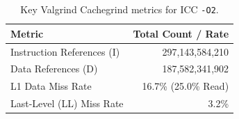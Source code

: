 \begin{table}[H]
\centering
\caption{Key Valgrind Cachegrind metrics for ICC \texttt{-O2}.}
\label{tab:cachegrind_results_o2}
\begin{tabular}{lr}
\toprule
\textbf{Metric} & \textbf{Total Count / Rate} \\
\midrule
Instruction References (I) & 297,143,584,210 \\
Data References (D)        & 187,582,341,902 \\
\midrule
L1 Data Miss Rate          & 16.7\% (25.0\% Read) \\
Last-Level (LL) Miss Rate  & 3.2\% \\
\bottomrule
\end{tabular}
\end{table}
